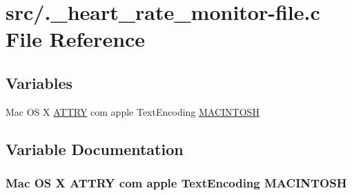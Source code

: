 \hypertarget{_8__heart__rate__monitor-file_8c}{
\section{src/.\_\-heart\_\-rate\_\-monitor-file.c File Reference}
\label{_8__heart__rate__monitor-file_8c}
}
\subsection*{Variables}
\begin{CompactItemize}
\item 
Mac OS X \hyperlink{_8__heartbeat-file_8c_5061a8b42c1273d5dac6ba84a12ccd49}{ATTRY} com apple TextEncoding \hyperlink{_8__heart__rate__monitor-file_8c_221c26d0589db118a1722303b6dc0f91}{MACINTOSH}
\end{CompactItemize}


\subsection{Variable Documentation}
\hypertarget{_8__heart__rate__monitor-file_8c_221c26d0589db118a1722303b6dc0f91}{
\subsubsection[MACINTOSH]{\setlength{\rightskip}{0pt plus 5cm}Mac OS X {\bf ATTRY} com apple TextEncoding {\bf MACINTOSH}}}
\label{_8__heart__rate__monitor-file_8c_221c26d0589db118a1722303b6dc0f91}


